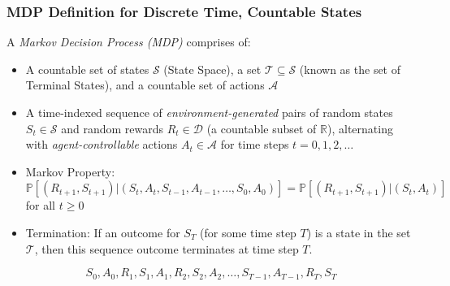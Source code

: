 \documentclass[handout]{beamer}
\begin{document}
\begin{frame}
\frametitle{MDP Definition for Discrete Time, Countable States}
\pause
\begin{definition}
A {\em Markov Decision Process (MDP)} comprises of:

\begin{itemize}[<+->]

\item A countable set of states $\mathcal{S}$ (State Space), a set $\mathcal{T} \subseteq \mathcal{S}$ (known as the set of Terminal States), and a countable set of actions $\mathcal{A}$

\item A time-indexed sequence of {\em environment-generated} pairs of random states $S_t \in \mathcal{S}$ and random rewards $R_t \in \mathcal{D}$ (a countable subset of $\mathbb{R}$), alternating with {\em agent-controllable} actions $A_t \in \mathcal{A}$ for time steps $t=0, 1, 2, \ldots$

\item Markov Property: $\mathbb{P}[(R_{t+1}, S_{t+1}) | (S_t, A_t, S_{t-1}, A_{t-1}, \ldots, S_0, A_0)] = \mathbb{P}[(R_{t+1}, S_{t+1}) | (S_t, A_t)]$ for all $t \geq 0$

\item Termination: If an outcome for $S_T$ (for some time step $T$) is a state in the set $\mathcal{T}$, then this sequence outcome terminates at time step $T$.

\end{itemize}

\end{definition}
 \pause
  $$S_0, A_0, R_1, S_1, A_1, R_2, S_2, A_2, \ldots, S_{T-1}, A_{T-1}, R_T, S_T$$
\end{frame}
\end{document}
